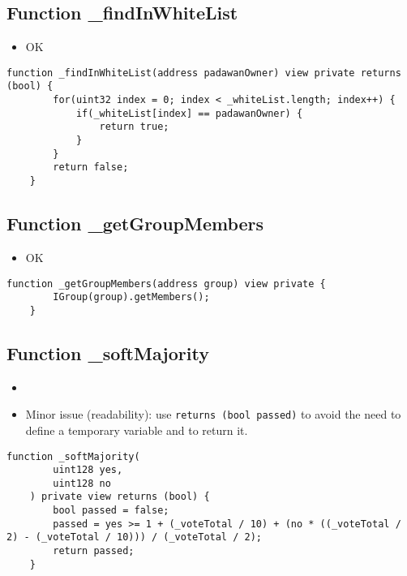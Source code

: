 \subsection{Function \_{}findInWhiteList}

\begin{itemize}
\item OK
\end{itemize}

\begin{lstlisting}[firstnumber=224]
    function _findInWhiteList(address padawanOwner) view private returns (bool) {
        for(uint32 index = 0; index < _whiteList.length; index++) {
            if(_whiteList[index] == padawanOwner) {
                return true;
            }
        }
        return false;
    }
\end{lstlisting}

\subsection{Function \_{}getGroupMembers}

\begin{itemize}
\item OK
\end{itemize}

\begin{lstlisting}[firstnumber=233]
    function _getGroupMembers(address group) view private {
        IGroup(group).getMembers();
    }
\end{lstlisting}

\subsection{Function \_{}softMajority}

\begin{itemize}
\item {}
\item Minor issue (readability): use {\tt returns (bool passed)} to
  avoid the need to define a temporary variable and to return it.
\end{itemize}

\begin{lstlisting}[firstnumber=170]
    function _softMajority(
        uint128 yes,
        uint128 no
    ) private view returns (bool) {
        bool passed = false;
        passed = yes >= 1 + (_voteTotal / 10) + (no * ((_voteTotal / 2) - (_voteTotal / 10))) / (_voteTotal / 2);
        return passed;
    }
\end{lstlisting}

